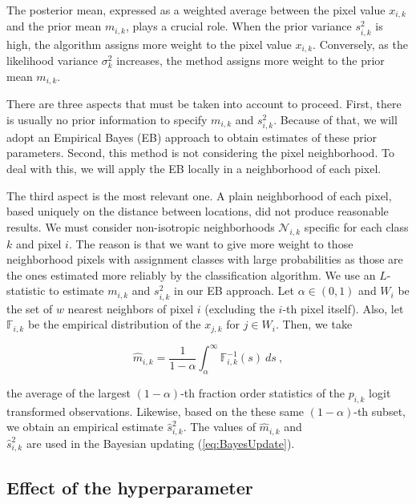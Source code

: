 \documentclass[
  shortnames]{jss}
\begin{document}
The posterior mean, expressed as a weighted average between the pixel value \(x_{i,k}\)
and the prior mean \(m_{i,k}\), plays a crucial role. When the prior variance \(s^2_{i,k}\)
is high, the algorithm assigns more weight to the pixel value \(x_{i,k}\). Conversely, as the likelihood variance \(\sigma^2_k\) increases, the method assigns more weight to the prior mean
\(m_{i,k}\).

There are three aspects that must be taken into account to proceed. First, there is usually
no prior information to specify \(m_{i,k}\) and \(s^2_{i,k}\). Because of that, we will adopt an Empirical Bayes (EB) approach to obtain estimates of these prior parameters. Second, this method is not considering the pixel neighborhood. To deal with this, we will apply the EB
locally in a neighborhood of each pixel.

The third aspect is the most relevant one. A plain neighborhood of each pixel, based uniquely on the distance between locations, did not produce reasonable results. We must consider non-isotropic neighborhoods \(\mathcal{N}_{i,k}\) specific for each class \(k\) and pixel \(i\). The reason is that we want to give more weight to those neighborhood pixels with assignment classes with large probabilities as those are the ones estimated more reliably by the classification algorithm. We use an \(L\)-statistic to estimate \(m_{i,k}\) and \(s^2_{i,k}\) in our EB approach. Let \(\alpha \in (0, 1)\) and \(W_{i}\) be the set of \(w\) nearest neighbors of pixel \(i\) (excluding the \(i\)-th pixel itself). Also, let \(\mathbb{F}_{i,k}\) be the empirical distribution of the \(x_{j,k}\) for \(j \in W_i\).
Then, we take

\begin{equation}
\hat{m}_{i,k} = \frac{1}{1-\alpha} \int_{\alpha}^{\infty} \mathbb{F}_{i,k}^{-1}(s) ~ ds \: , 
\end{equation}

the average of the largest \((1-\alpha)\)-th fraction order statistics of the \(p_{i,k}\) logit transformed observations. Likewise, based on the these same \((1-\alpha)\)-th subset,
we obtain an empirical estimate \(\hat{s}^2_{i,k}\). The values of \(\hat{m}_{i,k}\) and\\
\(\hat{s}^2_{i,k}\) are used in the Bayesian updating (\ref{eq:BayesUpdate}).

\hypertarget{effect-of-the-hyperparameter}{%
\subsection{Effect of the hyperparameter}\label{effect-of-the-hyperparameter}}
\end{document}
